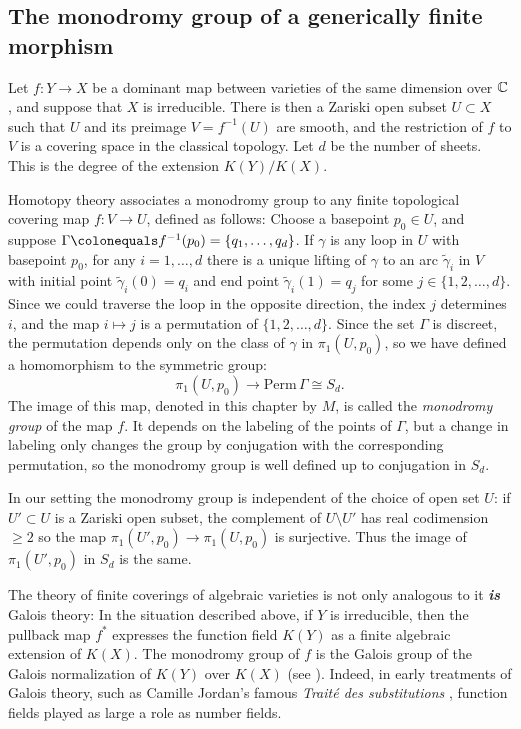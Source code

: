 \subsection*{The monodromy group of a generically finite morphism}

Let $f : Y \to X$ be a
dominant map between varieties of the same dimension
%
over $\CC$, and suppose that $X$ is irreducible. There is then
a Zariski open subset $U \subset X$ such that $U$ and
its preimage $V = f^{-1}(U)$ are smooth, and the restriction of $f$
to $V$ is a covering space in the classical topology. Let $d$ be the
%
number of sheets. This is the degree of the extension $K(Y)/K(X)$.

Homotopy theory
%
associates a monodromy group to any finite
topological covering map $f : V \to U$, defined as follows: Choose a
basepoint $p_0 \in U$, and suppose $\Gamma \colonequals  f^{-1}(p_0)  =
\{q_1,\dots,q_d\}$. If $\gamma$ is any loop in $U$ with basepoint $p_0$,
for any $i = 1, \dots, d$ there is a unique lifting of $\gamma$ to an
arc $\tilde \gamma_i$ in $V$ with initial point $\tilde \gamma_i(0)
= q_i$ and end point $\tilde \gamma_i(1) = q_j$ for some $j \in
\{1,2,\dots,d\}$. Since we could traverse the loop in the opposite
direction, the index $j$ determines $i$, and the map $i\mapsto j$ is a
permutation of $\{1,2,\dots,d\}$.
Since the set $\Gamma$ is discreet, the permutation depends only on the
class of $\gamma$ in $\pi_1(U,p_0)$, so we have defined a homomorphism
to the
symmetric group:
%
$$
\pi_1(U,p_0)  \to \mathrm{ Perm}\,\Gamma \cong S_d.
$$
The image of this map,
 denoted in this chapter by $M$,
is called the \emph{monodromy group} of the
map $f$. It depends on the labeling of the points of $\Gamma$, but a
change in labeling
only changes the group by conjugation with the corresponding permutation,
so the monodromy group is well defined up to
conjugation in $S_{d}$.
\vspace*{3pt}

\begin{fact}\label{Galois equals monodromy}
In our setting  the monodromy group is independent of the choice of open
set $U$: if $U' \subset U$ is a Zariski open subset, the complement of
$U\setminus U'$ has
real codimension $\geq 2$ so the map $\pi_1(U', p_0) \to \pi_1(U,p_0)$
is surjective. Thus the image of $\pi_1(U', p_0)$ in $S_d$ is the same.

The theory of finite coverings of algebraic varieties is not only
analogous to
%
it \emph{\bfseries{is}} Galois theory: In the situation
described above, if $Y$ is irreducible, then the pullback map $f^*$
expresses the function field $K(Y)$ as a finite algebraic extension of
$K(X)$. The monodromy group of $f$  is the Galois group of the Galois
%
normalization of $K(Y)$ over $K(X)$ (see \cite{Harris1979}). Indeed,
in early treatments of Galois theory, such as
Camille Jordan's
famous \emph{Trait\'e
%
des substitutions} \citeyear{MR1188877},
function fields played as large a role as number fields.
%
%
\end{fact}

